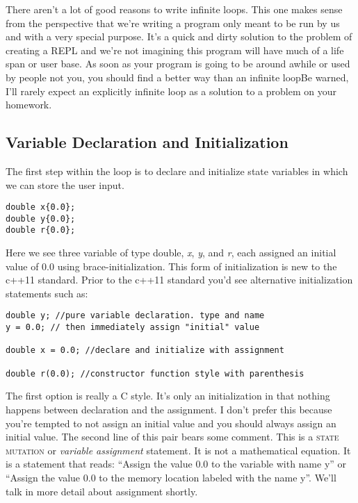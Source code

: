 \documentclass[]{tufte-handout}
\begin{document}
There aren't a lot of good reasons to write infinite loops. This one makes sense from the perspective that we're writing a program only meant to be run by us and with a very special purpose. It's a quick and dirty solution to the problem of creating a REPL and we're not imagining this program will have much of a life span or user base. As soon as your program is going to be around awhile or used by people not you, you should find a better way than an infinite loopBe warned, I'll rarely expect an explicitly infinite loop as a solution to a problem on your homework.


\subsection{Variable Declaration and Initialization}

The first step within the loop is to declare and initialize state variables in which we can store the user input.

\begin{verbatim}
double x{0.0};
double y{0.0};
double r{0.0};
\end{verbatim}

Here we see three variable of type double, \textit{x}, \textit{y}, and \textit{r}, each assigned an initial value of $0.0$ using brace-initialization. This form of initialization is new to the c++11 standard. Prior to the c++11 standard you'd see alternative initialization statements such as:
\begin{verbatim}
double y; //pure variable declaration. type and name
y = 0.0; // then immediately assign "initial" value

double x = 0.0; //declare and initialize with assignment

double r(0.0); //constructor function style with parenthesis
\end{verbatim}

The first option is really a C style. It's only an initialization in that nothing happens between declaration and the assignment. I don't prefer this because you're tempted to not assign an initial value and you should always assign an initial value. The second line of this pair bears some comment. This is a \textsc{state mutation} or \textit{variable assignment} statement. It is not a mathematical equation. It is a statement that reads: ``Assign the value 0.0 to the variable with name y'' or ``Assign the value 0.0 to the memory location labeled with the name y''. We'll talk in more detail about assignment shortly.
\end{document}

